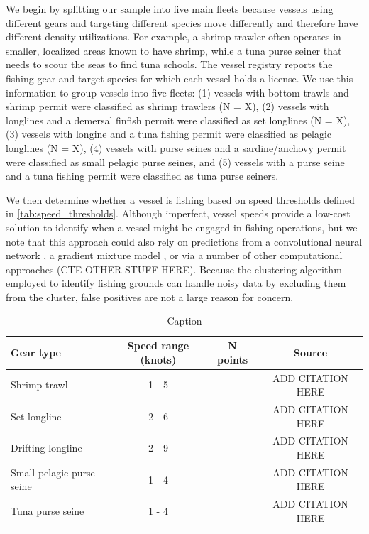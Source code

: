 \documentclass[12pt]{article}
\begin{document}
We begin by splitting our sample into five main fleets because vessels using different gears and targeting different species move differently and therefore have different density utilizations. For example, a shrimp trawler often operates in smaller, localized areas known to have shrimp, while a tuna purse seiner that needs to scour the seas to find tuna schools. The vessel registry reports the fishing gear and target species for which each vessel holds a license. We use this information to group vessels into five fleets: (1) vessels with bottom trawls and shrimp permit were classified as shrimp trawlers (N = X), (2) vessels with longlines and a demersal finfish permit were classified as set longlines (N = X), (3) vessels with longine and a tuna fishing permit were classified as pelagic longlines (N = X), (4) vessels with purse seines and a sardine/anchovy permit were classified as small pelagic purse seines, and (5) vessels with a purse seine and a tuna fishing permit were classified as tuna purse seiners.

We then determine whether a vessel is fishing based on speed thresholds defined in \autoref{tab:speed_thresholds}. Although imperfect, vessel speeds provide a low-cost solution to identify when a vessel might be engaged in fishing operations, but we note that this approach could also rely on predictions from a convolutional neural network \citep{Kroodsma2018-xq}, a gradient mixture model \citep{Dettloff2024-rm}, or via a number of other computational approaches (CTE OTHER STUFF HERE). Because the clustering algorithm employed to identify fishing grounds can handle noisy data by excluding them from the cluster, false positives are not a large reason for concern.

\begin{table}[t]
    \centering
    \caption{Caption}
    \begin{tabular}{lccc}
        \toprule
        Gear type  & Speed range (knots) & N points & Source \\
        \midrule
        Shrimp trawl              & 1 - 5   &   &  ADD CITATION HERE \\
        Set longline              & 2 - 6   &   &  ADD CITATION HERE \\
        Drifting longline         & 2 - 9   &   &  ADD CITATION HERE \\
        Small pelagic purse seine & 1 - 4   &   &  ADD CITATION HERE \\
        Tuna purse seine          & 1 - 4   &   &  ADD CITATION HERE \\
        \bottomrule
    \end{tabular}
    \label{tab:speed_thresholds}
\end{table}
\end{document}
